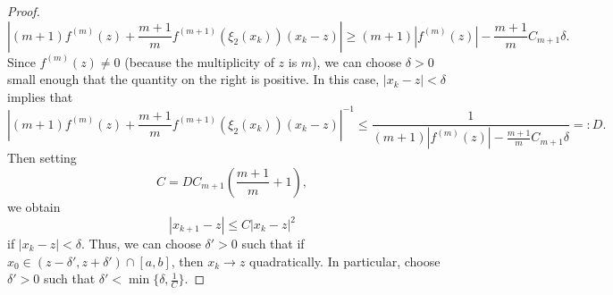 \documentclass[newpage]{homework}
\begin{document}
\begin{proof}
	\begin{equation*}
		\left|(m+1)f^{(m)}(z) + \frac{m+1}{m}f^{(m+1)}(\xi_2(x_k))(x_k-z)\right| \ge (m+1)\left|f^{(m)}(z)\right| - \frac{m+1}{m}C_{m+1}\delta.
	\end{equation*}
	Since $f^{(m)}(z) \ne 0$ (because the multiplicity of $z$ is $m$), we can choose $\delta > 0$ small enough that the quantity on the right is positive. In this case, $|x_k - z| < \delta$ implies that
	\begin{equation*}
		\left|(m+1)f^{(m)}(z) + \frac{m+1}{m}f^{(m+1)}(\xi_2(x_k))(x_k-z)\right|^{-1} \le \frac{1}{(m+1)\left|f^{(m)}(z)\right| - \frac{m+1}{m}C_{m+1}\delta} =: D.
	\end{equation*}
	Then setting
	\begin{equation*}
		C = DC_{m+1}\left(\frac{m+1}{m} + 1\right),
	\end{equation*}
	we obtain
	\begin{equation*}
		|x_{k+1} - z| \le C|x_k - z|^2
	\end{equation*}
	if $|x_k - z| < \delta$. Thus, we can choose $\delta' > 0$ such that if $x_0 \in (z-\delta', z+\delta') \cap [a,b]$, then $x_k \to z$ quadratically. In particular, choose $\delta' > 0$ such that $\delta' < \min\{\delta, \frac{1}{C}\}$.
\end{proof}
\end{document}
